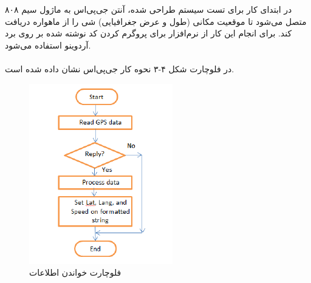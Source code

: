 در ابتدای کار برای تست سیستم طراحی شده، آنتن جی‌پی‌اس به ماژول سیم ۸۰۸ متصل می‌شود تا موقعیت مکانی (طول و عرض جغرافیایی) شی را از ماهواره دریافت کند. برای انجام این کار از نرم‌افزار  برای پروگرم کردن کد نوشته شده بر روی برد آردوینو استفاده می‌شود.\\
\\
در فلوچارت شکل ۴-۳ نحوه کار جی‌پی‌اس نشان داده شده است.
\begin{figure}[!h]
	\centerline{\includegraphics[width=.3\textwidth]{gps-flowchart}}
	\caption{فلوچارت خواندن اطلاعات  \cite{ElShafee2013}}
\end{figure}


